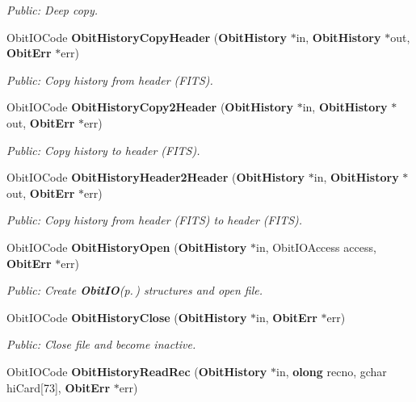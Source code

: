\begin{CompactItemize}
\begin{CompactList}\small\item\em Public: Deep copy. \item\end{CompactList}\item 
Obit\-IOCode {\bf Obit\-History\-Copy\-Header} ({\bf Obit\-History} $\ast$in, {\bf Obit\-History} $\ast$out, {\bf Obit\-Err} $\ast$err)
\begin{CompactList}\small\item\em Public: Copy history from header (FITS). \item\end{CompactList}\item 
Obit\-IOCode {\bf Obit\-History\-Copy2Header} ({\bf Obit\-History} $\ast$in, {\bf Obit\-History} $\ast$out, {\bf Obit\-Err} $\ast$err)
\begin{CompactList}\small\item\em Public: Copy history to header (FITS). \item\end{CompactList}\item 
Obit\-IOCode {\bf Obit\-History\-Header2Header} ({\bf Obit\-History} $\ast$in, {\bf Obit\-History} $\ast$out, {\bf Obit\-Err} $\ast$err)
\begin{CompactList}\small\item\em Public: Copy history from header (FITS) to header (FITS). \item\end{CompactList}\item 
Obit\-IOCode {\bf Obit\-History\-Open} ({\bf Obit\-History} $\ast$in, Obit\-IOAccess access, {\bf Obit\-Err} $\ast$err)
\begin{CompactList}\small\item\em Public: Create {\bf Obit\-IO}{\rm (p.\,\pageref{structObitIO})} structures and open file. \item\end{CompactList}\item 
Obit\-IOCode {\bf Obit\-History\-Close} ({\bf Obit\-History} $\ast$in, {\bf Obit\-Err} $\ast$err)
\begin{CompactList}\small\item\em Public: Close file and become inactive. \item\end{CompactList}\item 
Obit\-IOCode {\bf Obit\-History\-Read\-Rec} ({\bf Obit\-History} $\ast$in, {\bf olong} recno, gchar hi\-Card[73], {\bf Obit\-Err} $\ast$err)

\end{CompactItemize}
